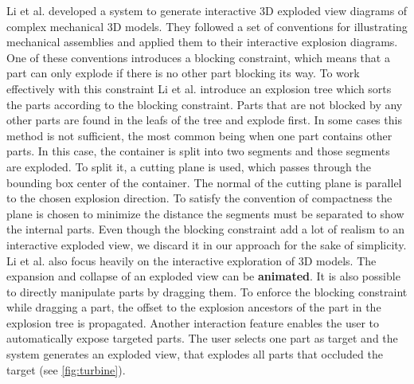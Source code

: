 \documentclass[draft,final]{vutinfth} %
\begin{document}
\par Li et al. \cite{li2008automated} developed a system to generate interactive 3D exploded view diagrams of complex mechanical 3D models. They followed a set of conventions for illustrating mechanical assemblies and applied them to their interactive explosion diagrams. One of these conventions introduces a blocking constraint, which means that a part can only explode if there is no other part blocking its way. To work effectively with this constraint Li et al. introduce an explosion tree which sorts the parts according to the blocking constraint. Parts that are not blocked by any other parts are found in the leafs of the tree and explode first. In some cases this method is not sufficient, the most common being when one part contains other parts. In this case, the container is split into two segments and those segments are exploded. To split it, a cutting plane is used, which passes through the bounding box center of the container. The normal of the cutting plane is parallel to the chosen explosion direction. To satisfy the convention of compactness the plane is chosen to minimize the distance the segments must be separated to show the internal parts. Even though the blocking constraint add a lot of realism to an interactive exploded view, we discard it in our approach for the sake of simplicity.
\\Li et al. \cite{li2008automated} also focus heavily on the interactive exploration of 3D models. The expansion and collapse of an exploded view can be \textbf{animated}. It is also possible to directly manipulate parts by dragging them. To enforce the blocking constraint while dragging a part, the offset to the explosion ancestors of the part in the explosion tree is propagated. Another interaction feature enables the user to automatically expose targeted parts. The user selects one part as target and the system generates an exploded view, that explodes all parts that occluded the target (see \autoref{fig:turbine}).
\end{document}
